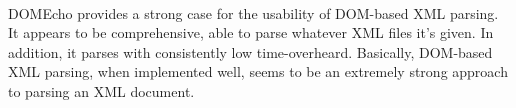 \documentclass[11pt,english]{article}
\begin{document}
\begin{enumerate}
\\
\par
DOMEcho provides a strong case for the usability of DOM-based XML parsing. It appears to be comprehensive, able to parse whatever XML files it's given. In addition, it parses with consistently low time-overheard. Basically, DOM-based XML parsing, when implemented well, seems to be an extremely strong approach to parsing an XML document.

\end{enumerate}
\end{document}
